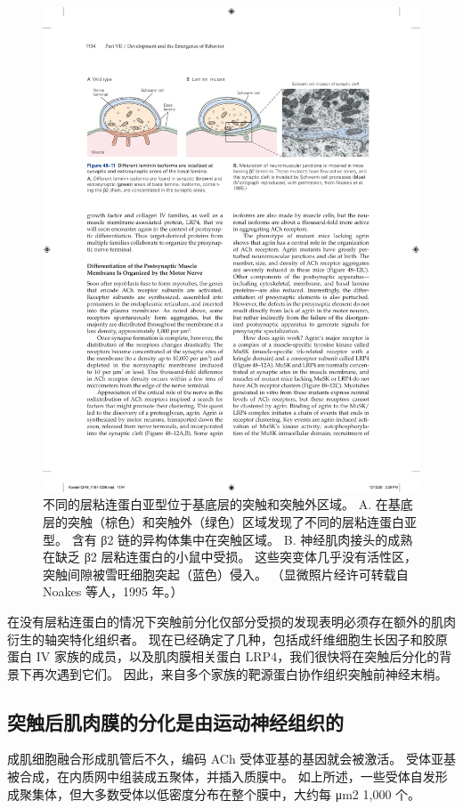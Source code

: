 \begin{figure}[htbp]
	\centering
	\includegraphics[width=0.9\linewidth]{chap48/fig_48_11}
	\caption{不同的层粘连蛋白亚型位于基底层的突触和突触外区域。 A. 在基底层的突触（棕色）和突触外（绿色）区域发现了不同的层粘连蛋白亚型。 含有 β2 链的异构体集中在突触区域。 B. 神经肌肉接头的成熟在缺乏 β2 层粘连蛋白的小鼠中受损。 这些突变体几乎没有活性区，突触间隙被雪旺细胞突起（蓝色）侵入。 （显微照片经许可转载自 Noakes 等人，1995 年。）}
	\label{fig:48_11}
\end{figure}


在没有层粘连蛋白的情况下突触前分化仅部分受损的发现表明必须存在额外的肌肉衍生的轴突特化组织者。 现在已经确定了几种，包括成纤维细胞生长因子和胶原蛋白 IV 家族的成员，以及肌肉膜相关蛋白 LRP4，我们很快将在突触后分化的背景下再次遇到它们。 因此，来自多个家族的靶源蛋白协作组织突触前神经末梢。

\subsection{突触后肌肉膜的分化是由运动神经组织的}
成肌细胞融合形成肌管后不久，编码 ACh 受体亚基的基因就会被激活。 受体亚基被合成，在内质网中组装成五聚体，并插入质膜中。 如上所述，一些受体自发形成聚集体，但大多数受体以低密度分布在整个膜中，大约每 μm2 1,000 个。

